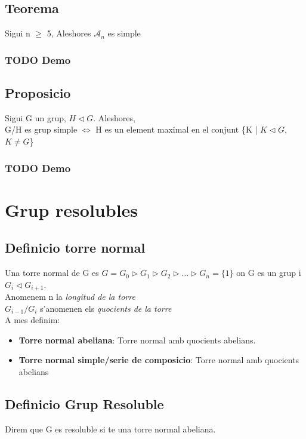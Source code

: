 \documentclass[11pt]{article}
\begin{document}
\subsection{Teorema}
\label{sec:org329026a}
Sigui n \(\geq\) 5, Aleshores \(\mathcal{A}_n\) es simple
\subsubsection{{\bfseries\sffamily TODO} Demo}
\label{sec:org1e5f02d}
\subsection{Proposicio}
\label{sec:orge5adb38}
    Sigui G un grup, \(H \vartriangleleft G\). Aleshores,\\
G/H es grup simple \(\iff\) H es un element maximal en el conjunt \{K | \(K \vartriangleleft G\), \(K \neq G\)\}
\subsubsection{{\bfseries\sffamily TODO} Demo}
\label{sec:org59c66d6}

\section{Grup resolubles}
\label{sec:orge5c1f3f}

\subsection{Definicio torre normal}
\label{sec:org6d78fca}
Una torre normal de G es \(G = G_0 \vartriangleright G_1 \vartriangleright G_2 \vartriangleright \ldots \vartriangleright G_n = \{1\}\) on G es un grup i \(G_i \vartriangleleft G_{i+1}\). \\
Anomenem n la \emph{longitud de la torre} \\
\(G_{i-1}/G_i\) s'anomenen els \emph{quocients de la torre} \\

A mes definim:
\begin{itemize}
\item \textbf{Torre normal abeliana}: Torre normal amb quocients abelians.
\item \textbf{Torre normal simple/serie de composicio}: Torre normal amb quocients abelians
\end{itemize}

\subsection{Definicio Grup Resoluble}
\label{sec:org5251e79}
Direm que G es resoluble si te una torre normal abeliana.
\end{document}
